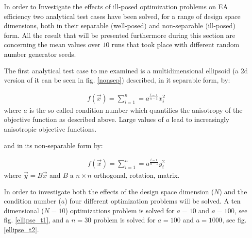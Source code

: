 In order to Investigate the effects of ill-posed optimization problems on EA efficiency two analytical test cases have been solved, for a range of design space dimensions, both in their separable (well-posed) and non-separable (ill-posed) form. All the result that will be presented furthermore during this section are concerning the mean values over $10$ runs that took place with different random number generator seeds. 

The first analytical test case to me examined is a multidimensional ellipsoid (a 2d version of it can be seen in fig. \ref{nonsep}) described, in it separable form, by:   


\begin{eqnarray}
   f(\vec{x})=\sum^{n}_{i=1}=a^{\frac{i-1}{n-1}}x_i^2
   \label{ellipse} 
\end{eqnarray}
where $a$ is the so called condition number which quantifies the anisotropy of the objective function as described above. Large values of $a$ lead to increasingly anisotropic objective functions.

and in its non-separable form by:

\begin{eqnarray}
   f(\vec{x})=\sum^{n}_{i=1}=a^{\frac{i-1}{n-1}}y_i^2
   \label{ellipse} 
\end{eqnarray}
where $\vec{y}=B\vec{x}$ and $B$ a $n\times n$ orthogonal, rotation, matrix.

In order to investigate both the effects of the design space dimension ($N$) and the condition number ($a$) four different optimization problems will be solved. A ten dimensional ($N=10$) optimizations problem is solved for $a=10$ and $a=100$, see fig. \ref{ellipse_t1}, and a $n=30$ problem is solved for $a=100$ and $a=1000$, see fig. \ref{ellipse_t2}. 


